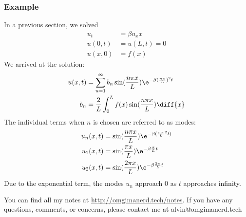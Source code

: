 \documentclass{math}
\begin{document}
\subsubsection*{Example}
In a previous section, we solved
\begin{align*}
  u_t &= \beta u_xx \\
  u(0,t) &= u(L,t) = 0 \\
  u(x,0) &= f(x)
\end{align*}
We arrived at the solution:
\begin{align*}
  u(x,t) &= \sum_{n=1}^{\infty}b_n
    \sin(\frac{n\pi x}{L})\e^{-\beta(\frac{n\pi}{L})^2t} \\
  b_n &= \frac{2}{L}\int_{0}^{L}f(x)\sin(\frac{n\pi x}{L})\diff{x}
\end{align*}
The individual terms when \( n \) is chosen are referred to as modes:
\begin{align*}
  u_n(x,t) &= \sin(\frac{n\pi x}{L})\e^{-\beta(\frac{n\pi}{L}^2t)} \\
  u_1(x,t) &= \sin(\frac{\pi x}{L})\e^{-\beta\frac{\pi}{L}t} \\
  u_2(x,t) &= \sin(\frac{2\pi x}{L})\e^{-\beta\frac{2\pi}{L}t}
\end{align*}
Due to the exponential term, the modes \( u_n \) approach 0 as \( t \)
approaches infinity.

\begin{center}
  You can find all my notes at \url{http://omgimanerd.tech/notes}. If you have
  any questions, comments, or concerns, please contact me at
  alvin@omgimanerd.tech
\end{center}
\end{document}
